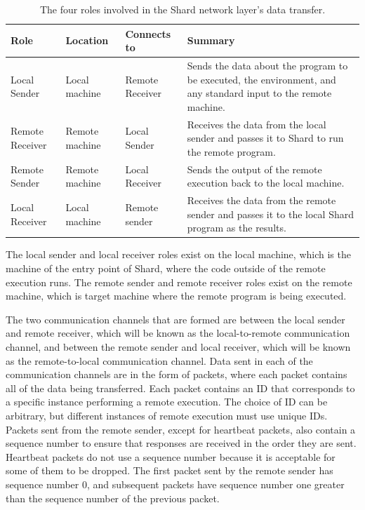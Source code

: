 \documentclass[twoside]{report}
\begin{document}
\begin{table}
  \begin{center}
    \begin{tabularx}{\textwidth}{|l|l|l|X|}
      \hline
      Role            & Location       & Connects to     & Summary                                                                                                         \\ \hline
      Local Sender    & Local machine  & Remote Receiver & Sends the data about the program to be executed, the environment, and any standard input to the remote machine.
      \\ \hline
      Remote Receiver & Remote machine & Local Sender    & Receives the data from the local sender and passes it to Shard to run the remote program.
      \\ \hline
      Remote Sender   & Remote machine & Local Receiver  & Sends the output of the remote execution back to the local machine.
      \\ \hline
      Local Receiver  & Local machine  & Remote sender   & Receives the data from the remote sender and passes it to the local Shard program as the results.
      \\ \hline
    \end{tabularx}
    \caption{The four roles involved in the Shard network layer's data transfer.}
    \label{fig:roles_design}
  \end{center}
\end{table}

The local sender and local receiver roles exist on the local machine, which is the machine of the entry point of Shard, where the code outside of the remote execution runs.
The remote sender and remote receiver roles exist on the remote machine, which is target machine where the remote program is being executed.

The two communication channels that are formed are between the local sender and remote receiver, which will be known as the local-to-remote communication channel, and between the remote sender and local receiver, which will be known as the remote-to-local communication channel.
Data sent in each of the communication channels are in the form of packets, where each packet contains all of the data being transferred.
Each packet contains an ID that corresponds to a specific instance performing a remote execution.
The choice of ID can be arbitrary, but different instances of remote execution must use unique IDs.
Packets sent from the remote sender, except for heartbeat packets, also contain a sequence number to ensure that responses are received in the order they are sent.
Heartbeat packets do not use a sequence number because it is acceptable for some of them to be dropped.
The first packet sent by the remote sender has sequence number 0, and subsequent packets have sequence number one greater than the sequence number of the previous packet.
\end{document}
